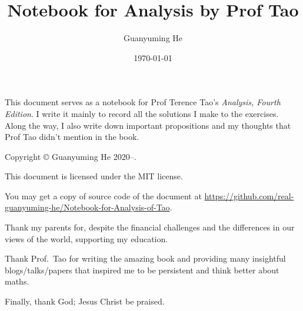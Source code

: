 \documentclass[oneside]{book}
\author{Guanyuming He}
\title{Notebook for Analysis by Prof Tao}
\date{\today}
\begin{document}
\pagestyle{empty}
\maketitle

This document serves as a notebook for Prof Terence Tao's \emph{Analysis, Fourth Edition}. I write it mainly to record all the solutions I make to the exercises. Along the way, I also write down important propositions and my thoughts that Prof Tao didn't mention in the book.

\vfill

\begin{center}
Copyright \copyright{} Guanyuming He 2020--\the\year{}. 

This document is licensed under the MIT license.

You may get a copy of source code of the document at 
\url{https://github.com/real-guanyuming-he/Notebook-for-Analysis-of-Tao}.
\end{center}

\newpage
Thank my parents for, despite the financial challenges and the differences in our views of the world, supporting my education.

Thank Prof.~Tao for writing the amazing book and providing many insightful blogs/talks/papers that inspired me to be persistent and think better about maths.

Finally, thank God; Jesus Christ be praised.

\newpage
\pagestyle{headings}
\tableofcontents


\newpage


\newpage
{}
\pagestyle{headings}



\newpage


\newpage


\newpage
%

\newpage
%

\newpage
%

\newpage
%

\newpage
%

\newpage
%

%

%


%
\end{document}
